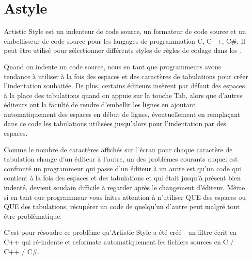 \section{Astyle}\label{sec:astyle}

Artistic Style est un indenteur de code source, un formateur de code source et un embellisseur de code source pour les langages de programmation C, C++, C\#. Il peut être utilisé pour sélectionner différents styles de règles de codage dans les \codeblocks.


Quand on indente un code source, nous en tant que programmeurs avons tendance à utiliser à la fois des espaces et des caractères de tabulations pour créer l'indentation souhaitée. De plus, certains éditeurs insèrent par défaut des espaces à la place des tabulations quand on appuie sur la touche Tab, alors que d'autres éditeurs ont la faculté de rendre d'embellir les lignes en ajoutant automatiquement des espaces en début de lignes, éventuellement en remplaçant dans ce code les tabulations utilisées jusqu'alors pour l'indentation par des espaces.

Comme le nombre de caractères affichés sur l'écran pour chaque caractère de tabulation change d'un éditeur à l'autre, un des problèmes courants auquel est confronté un programmeur qui passe d'un éditeur à un autre est qu'un code qui contient à la fois des espaces et des tabulations et qui était jusqu'à présent bien indenté, devient soudain difficile à regarder après le changement d'éditeur. Même si en tant que programmeur vous faites attention à n'utiliser QUE des espaces ou QUE des tabulations, récupérer un code de quelqu'un d'autre peut malgré tout être problématique.

C'est pour résoudre ce problème qu'Artistic Style a été créé - un filtre écrit en C++ qui ré-indente et reformate automatiquement les fichiers sources en C / C++ / C\#.

